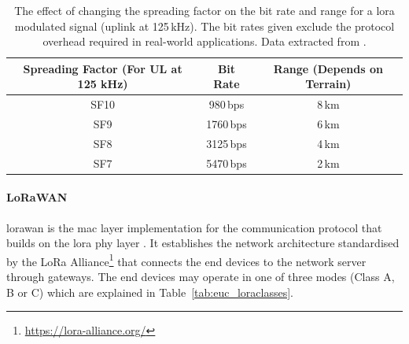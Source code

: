 \begin{table}[h!]
    \centering
    \begin{tabular}{|c|c|c|}
    \hline
        \textbf{Spreading Factor} (For UL at 125 kHz) & \textbf{Bit Rate} & \textbf{Range} (Depends on Terrain) \\
    \hline\hline
        SF10 & 980\,bps & 8\,km \\
    \hline
        SF9 & 1760\,bps & 6\,km \\
    \hline
        SF8 & 3125\,bps & 4\,km \\
    \hline
        SF7 & 5470\,bps & 2\,km \\
    \hline
    \end{tabular}
    \caption[LoRa Spreading Factors' Effect on Bit Rate and Range]{The effect of changing the spreading factor on the bit rate and range for a \gls{lora} modulated signal (uplink at 125\,kHz). The bit rates given exclude the protocol overhead required in real-world applications. Data extracted from \cite{semtech2024lora}.}
    \label{tab:euc_lorasf}
\end{table}

\paragraph{LoRaWAN} \gls{lorawan} is the \gls{mac} layer implementation for the communication protocol that builds on the \gls{lora} \gls{phy} layer \cite{semtech2024lora}. It establishes the network architecture standardised by the LoRa Alliance\footnote{\url{https://lora-alliance.org/}} that connects the end devices to the network server through gateways. The end devices may operate in one of three modes (Class A, B or C) which are explained in Table~\ref{tab:euc_loraclasses}. 

